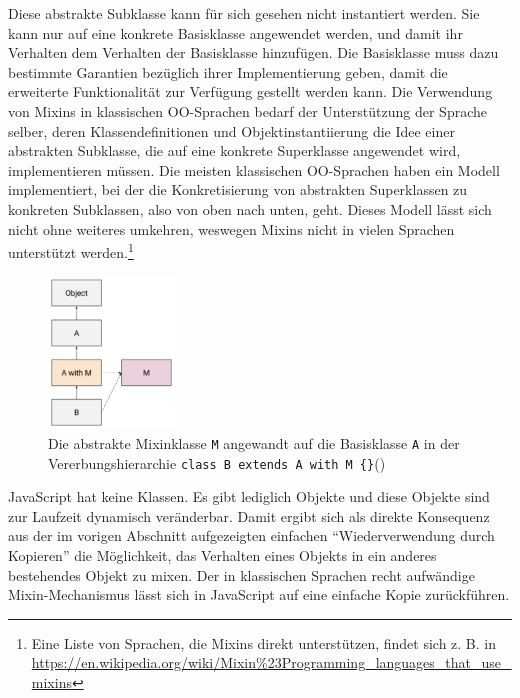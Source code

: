 Diese abstrakte Subklasse kann für sich gesehen nicht instantiert werden. Sie kann nur auf eine konkrete Basisklasse angewendet werden, und damit ihr Verhalten dem Verhalten der Basisklasse hinzufügen. Die Basisklasse muss dazu bestimmte Garantien bezüglich ihrer Implementierung geben, damit die erweiterte Funktionalität zur Verfügung gestellt werden kann. Die Verwendung von Mixins in klassischen OO-Sprachen bedarf der Unterstützung der Sprache selber, deren Klassendefinitionen und Objektinstantiierung die Idee einer abstrakten Subklasse, die auf eine konkrete Superklasse angewendet wird, implementieren müssen. Die meisten klassischen OO-Sprachen haben ein Modell implementiert, bei der die Konkretisierung von abstrakten Superklassen zu konkreten Subklassen, also von oben nach unten, geht. Dieses Modell lässt sich nicht ohne weiteres umkehren, weswegen Mixins nicht in vielen Sprachen unterstützt werden.\footnote{Eine Liste von Sprachen, die Mixins direkt unterstützen, findet sich z. B. in \url{https://en.wikipedia.org/wiki/Mixin\%23Programming_languages_that_use_mixins}
}


\begin{figure}[h]
	\centering
	\includegraphics[width=0.3\textwidth]{images/mixinAbstractSubClass.png}
	\caption{\label{mixinAbstractSubClass}Die abstrakte Mixinklasse \texttt{M} angewandt auf die Basisklasse \texttt{A} in der Vererbungshierarchie \texttt{class B extends A with M \{\}}(\citep{FagnaniRealMixinsJavaScript2015})}
\end{figure}

\skippingparagraph

JavaScript hat keine Klassen. Es gibt lediglich Objekte und diese Objekte sind zur Laufzeit dynamisch veränderbar. Damit ergibt sich als direkte Konsequenz aus der im vorigen Abschnitt aufgezeigten einfachen "`Wiederverwendung durch Kopieren"' die Möglichkeit, das Verhalten eines Objekts in ein anderes bestehendes Objekt zu mixen. Der in klassischen Sprachen recht aufwändige Mixin-Mechanismus lässt sich in JavaScript auf eine einfache Kopie zurückführen.

